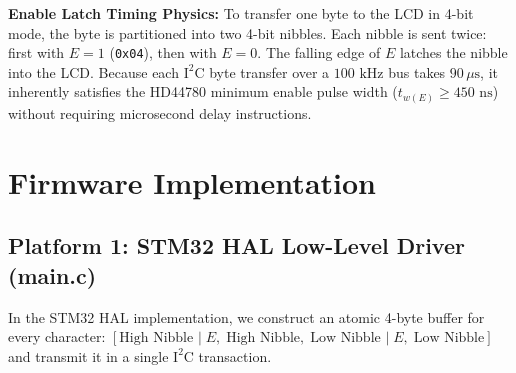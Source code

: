 \documentclass[11pt,a4paper]{article}
\begin{document}
\begin{theorybox}
\textbf{Enable Latch Timing Physics:} To transfer one byte to the LCD in 4-bit mode, the byte is partitioned into two 4-bit nibbles. Each nibble is sent twice: first with $E=1$ (\texttt{0x04}), then with $E=0$. The falling edge of $E$ latches the nibble into the LCD. Because each $\text{I}^2\text{C}$ byte transfer over a $100\text{ kHz}$ bus takes $90\,\mu\text{s}$, it inherently satisfies the HD44780 minimum enable pulse width ($t_{w(E)} \ge 450\text{ ns}$) without requiring microsecond delay instructions.
\end{theorybox}

\section{Firmware Implementation}

\subsection{Platform 1: STM32 HAL Low-Level Driver (main.c)}
In the STM32 HAL implementation, we construct an atomic 4-byte buffer for every character: $[ \text{High Nibble }|\; E, \; \text{High Nibble}, \; \text{Low Nibble }|\; E, \; \text{Low Nibble} ]$ and transmit it in a single $\text{I}^2\text{C}$ transaction.
\end{document}
